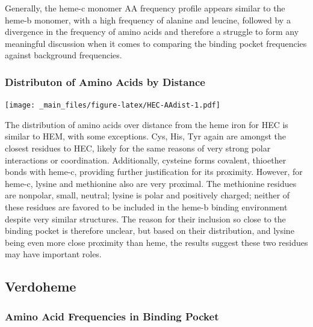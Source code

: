 \documentclass[a4paper, nobind]{templates/ociamthesis}
\let\origfigure\figure
\let\endorigfigure\endfigure
\renewenvironment{figure}[1][2] {
    \expandafter\origfigure\expandafter[H]
} {
    \endorigfigure
}
\begin{document}
Generally, the heme-c monomer AA frequency profile appears similar to the heme-b monomer, with a high frequency of alanine and leucine, followed by a divergence in the frequency of amino acids and therefore a struggle to form any meaningful discussion when it comes to comparing the binding pocket frequencies against background frequencies.

\hypertarget{distributon-of-amino-acids-by-distance-1}{%
\subsubsection{Distributon of Amino Acids by Distance}\label{distributon-of-amino-acids-by-distance-1}}

\begin{figure}
\centering
\texttt{[image: \_main\_files/figure-latex/HEC-AAdist-1.pdf]}
\caption{\label{fig:HEC-AAdist}HEC: Residue Distribution by Distance}
\end{figure}

The distribution of amino acids over distance from the heme iron for HEC is similar to HEM, with some exceptions. Cys, His, Tyr again are amongst the closest residues to HEC, likely for the same reasons of very strong polar interactions or coordination. Additionally, cysteine forms covalent, thioether bonds with heme-c, providing further justification for its proximity. However, for heme-c, lysine and methionine also are very proximal. The methionine residues are nonpolar, small, neutral; lysine is polar and positively charged; neither of these residues are favored to be included in the heme-b binding environment despite very similar structures. The reason for their inclusion so close to the binding pocket is therefore unclear, but based on their distribution, and lysine being even more close proximity than heme, the results suggest these two residues may have important roles.

\hypertarget{verdoheme-1}{%
\subsection{Verdoheme}\label{verdoheme-1}}

\hypertarget{amino-acid-frequencies-in-binding-pocket-2}{%
\subsubsection{Amino Acid Frequencies in Binding Pocket}\label{amino-acid-frequencies-in-binding-pocket-2}}
\end{document}
